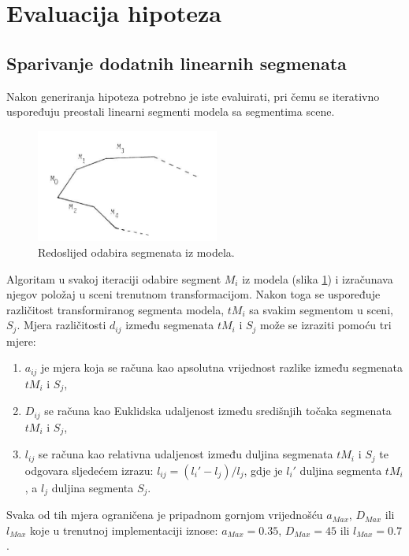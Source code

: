 \documentclass[lmodern, utf8, seminar, numeric]{fer}
\begin{document}
\section{Evaluacija hipoteza}
\subsection{Sparivanje dodatnih linearnih segmenata}
Nakon generiranja hipoteza potrebno je iste evaluirati, pri čemu se iterativno uspoređuju preostali linearni segmenti modela sa segmentima scene.

\begin{figure}[htb]
\begin{center}
\includegraphics[width=6cm]{resources/segmenti.png}
\end{center}
\caption{Redoslijed odabira segmenata iz modela.}
\label{fig:redoslijed_odabira}
\end{figure}

Algoritam u svakoj iteraciji odabire segment $M_i$ iz modela (slika
\ref{fig:redoslijed_odabira}) i izračunava njegov položaj u sceni trenutnom
transformacijom. Nakon toga se uspoređuje različitost transformiranog segmenta
modela, $tM_i$ sa svakim segmentom u sceni, $S_j$. Mjera različitosti $d_{ij}$
između segmenata $tM_i$ i $S_j$ može se izraziti pomoću tri mjere:

\begin{enumerate}
  \item $a_{ij}$ je mjera koja se računa kao apsolutna vrijednost razlike između segmenata $tM_i$ i $S_j$,
  \item $D_{ij}$
se računa kao Euklidska udaljenost između središnjih točaka segmenata $tM_i$ i $S_j$,
  \item $l_{ij}$ se računa kao relativna udaljenost između duljina segmenata $tM_i$ i $S_j$ te odgovara sljedećem izrazu: $l_{ij}=(l_i'-l_j)/l_j$, gdje je $l_i'$ duljina segmenta $tM_i$, a $l_j$ duljina segmenta $S_j$.
\end{enumerate}

Svaka od tih mjera ograničena je pripadnom gornjom vrijednošću $a_{Max}$,
$D_{Max}$ ili $l_{Max}$ koje u trenutnoj implementaciji iznose: $a_{Max}=0.35$,
$D_{Max}=45$ ili $l_{Max}=0.7$.
\end{document}
